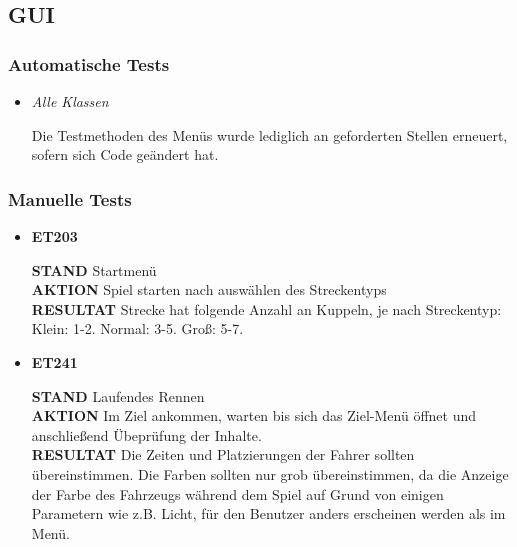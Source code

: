 \subsection{GUI}

\subsubsection{Automatische Tests}
\begin{itemize}
    \item \textit{Alle Klassen}
        \begin{leftbar}[0.9\linewidth]
			Die Testmethoden des Menüs wurde lediglich an geforderten Stellen 
			erneuert, sofern sich Code geändert hat.
        \end{leftbar}
\end{itemize}

\subsubsection{Manuelle Tests}
	\begin{itemize} [label={}]
		\item \textbf{ET203}\par 
			\textbf{STAND} Startmenü\\
			\textbf{AKTION} Spiel starten nach auswählen des Streckentyps\\
			\textbf{RESULTAT} Strecke hat folgende Anzahl an Kuppeln, je nach Streckentyp:
			Klein: 1-2. Normal: 3-5. Groß: 5-7.\\\par
            
        \item \textbf{ET241}\par 
			\textbf{STAND} Laufendes Rennen\\
			\textbf{AKTION} Im Ziel ankommen, warten bis sich das Ziel-Menü öffnet
			und anschließend Übeprüfung der Inhalte.\\
			\textbf{RESULTAT} Die Zeiten und Platzierungen der Fahrer sollten übereinstimmen. 
			Die Farben sollten nur grob übereinstimmen, da die Anzeige der Farbe 
			des Fahrzeugs während dem Spiel auf Grund von einigen Parametern wie z.B. Licht, 
			für den Benutzer anders erscheinen werden als im Menü.\\\par

	\end{itemize}
